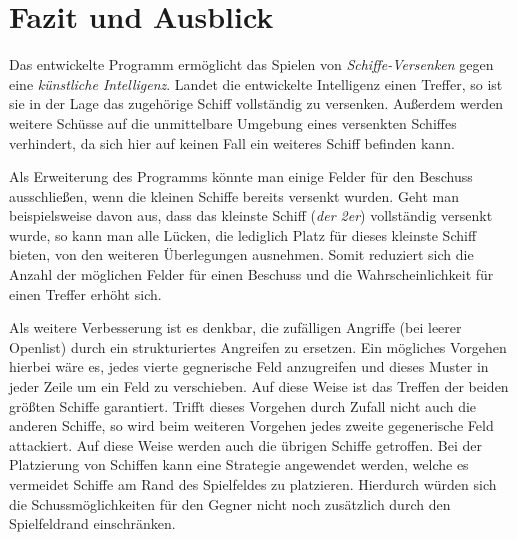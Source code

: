 \section{Fazit und Ausblick} \label{sec:Ausblick}

	Das entwickelte Programm ermöglicht das Spielen von \textit{Schiffe-Versenken} gegen eine \textit{künstliche Intelligenz}. 
	Landet die entwickelte Intelligenz einen Treffer, so ist sie in der Lage das zugehörige Schiff vollständig zu versenken. 
	Außerdem werden weitere Schüsse auf die unmittelbare Umgebung eines versenkten Schiffes verhindert, da sich hier auf keinen Fall ein
	weiteres Schiff befinden kann.
	
	Als Erweiterung des Programms könnte man einige Felder für den Beschuss ausschließen, wenn die kleinen Schiffe bereits versenkt wurden.
	Geht man beispielsweise davon aus, dass das kleinste Schiff (\textit{der 2er}) vollständig versenkt wurde, so kann man alle 
	Lücken, die lediglich Platz für dieses kleinste Schiff bieten, von den weiteren Überlegungen ausnehmen. Somit reduziert sich die 
	Anzahl der möglichen Felder für einen Beschuss und die Wahrscheinlichkeit für einen Treffer erhöht sich.

	Als weitere Verbesserung ist es denkbar, die zufälligen Angriffe (bei leerer Openlist) durch ein strukturiertes Angreifen zu ersetzen.
	Ein mögliches Vorgehen hierbei wäre es, jedes vierte gegnerische Feld anzugreifen und dieses Muster in jeder Zeile um ein Feld zu verschieben.  
	Auf diese Weise ist das Treffen der beiden größten Schiffe garantiert. Trifft dieses Vorgehen durch Zufall nicht auch die anderen 
	Schiffe, so wird beim weiteren Vorgehen jedes zweite gegenerische Feld attackiert. Auf diese Weise werden auch die übrigen Schiffe getroffen.
	Bei der Platzierung von Schiffen kann eine Strategie angewendet werden, welche es vermeidet Schiffe am Rand des Spielfeldes zu platzieren. 
	Hierdurch würden sich die Schussmöglichkeiten für den Gegner nicht noch zusätzlich durch den Spielfeldrand einschränken.
	
		


